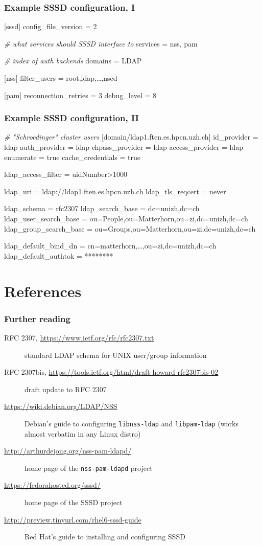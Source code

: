 \documentclass[english,serif,mathserif,usenames,dvipsnames]{beamer}
\begin{document}
\begin{frame}[fragile]
  \frametitle{Example SSSD configuration, I}
\begin{semiverbatim}\scriptsize
[sssd]
config_file_version = 2

\emph{# what services should SSSD interface to}
services = nss, pam

\emph{# index of auth backends}
domains = LDAP

[nss]
filter_users = root,ldap,\ldots,nscd

[pam]
reconnection_retries = 3
debug_level = 8
\end{semiverbatim}
\end{frame}

\begin{frame}[fragile]
  \frametitle{Example SSSD configuration, II}
\begin{semiverbatim}\scriptsize
\emph{# "Schroedinger" cluster users}
[domain/ldap1.ften.es.hpcn.uzh.ch]
id_provider = ldap
auth_provider = ldap
chpass_provider = ldap
access_provider = ldap
enumerate = true
cache_credentials = true

ldap_access_filter = uidNumber>1000

ldap_uri = ldap://ldap1.ften.es.hpcn.uzh.ch
ldap_tls_reqcert = never

ldap_schema = rfc2307
ldap_search_base = dc=unizh,dc=ch
ldap_user_search_base = ou=People,ou=Matterhorn,ou=zi,dc=unizh,dc=ch
ldap_group_search_base = ou=Groups,ou=Matterhorn,ou=zi,dc=unizh,dc=ch

ldap_default_bind_dn = cn=matterhorn,\ldots,ou=zi,dc=unizh,dc=ch
ldap_default_authtok = ********
\end{semiverbatim}
\end{frame}


\section{References}
\begin{frame}[fragile]
  \frametitle{Further reading}
  \footnotesize
  \begin{description}
  \item[RFC 2307, \url{https://www.ietf.org/rfc/rfc2307.txt}] standard LDAP schema for UNIX user/group information
  \item[RFC 2307bis, \url{https://tools.ietf.org/html/draft-howard-rfc2307bis-02}] draft update to RFC 2307
  \item[\url{https://wiki.debian.org/LDAP/NSS}] Debian's guide to configuring \texttt{libnss-ldap} and \texttt{libpam-ldap} (works almost verbatim in any Linux distro)
  \item[\url{http://arthurdejong.org/nss-pam-ldapd/}] home page of the \texttt{nss-pam-ldapd} project
  \item[\url{https://fedorahosted.org/sssd/}] home page of the SSSD project
  \item[\url{http://preview.tinyurl.com/rhel6-sssd-guide}] Red Hat's guide to installing and configuring SSSD
  \end{description}
\end{frame}
\end{document}

